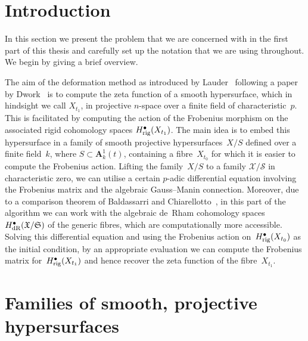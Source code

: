 

\section{Introduction}

In this section we present the problem that we are concerned with in 
the first part of this thesis and carefully set up the notation 
that we are using throughout.  We begin by giving a brief overview.

The aim of the deformation method as introduced by 
Lauder~\citep{Lau04} following a paper by Dwork~\citep{Dwork62b} 
is to compute the zeta function of a smooth 
hypersurface, which in hindsight we call $X_{t_1}$, in projective 
$n$-space over a finite field of characteristic~$p$.  This is 
facilitated by computing 
the action of the Frobenius morphism on the associated rigid cohomology 
spaces $H_{\text{rig}}^{\bullet}(X_{t_1})$.  The main idea is to embed this 
hypersurface in a family of smooth projective hypersurfaces~$X/S$ 
defined over a finite field~$k$, where $S \subset \mathbf{A}_k^1(t)$, 
containing a fibre~$X_{t_0}$ for which it is easier to compute the Frobenius 
action. Lifting the family~$X/S$ to a family $\mathcal{X}/\mathcal{S}$ in 
characteristic zero, we can utilise a certain $p$-adic differential 
equation involving the Frobenius matrix and the algebraic Gauss--Manin 
connection.  Moreover, due to a comparison theorem of Baldassarri and 
Chiarellotto~\citep{BalChi94}, in this 
part of the algorithm we can work with the algebraic de~Rham cohomology 
spaces~$H_{\text{dR}}^{\bullet}(\mathfrak{X}/\mathfrak{S})$ of the generic 
fibres, which are computationally more accessible.  Solving this differential 
equation and using the Frobenius action on~$H_{\text{rig}}^{\bullet}(X_{t_0})$ 
as the initial condition, by an appropriate evaluation we can compute 
the Frobenius matrix for~$H_{\text{rig}}^{\bullet}(X_{t_1})$ and hence recover 
the zeta function of the fibre~$X_{t_1}$.


\section{Families of smooth, projective hypersurfaces}

